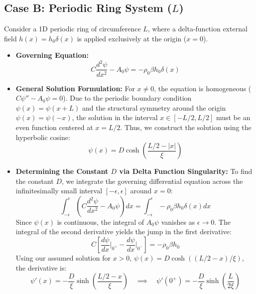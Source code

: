 \documentclass[12pt,a4paper]{article}
\begin{document}
\subsection{Case B: Periodic Ring System ($L$)}
Consider a 1D periodic ring of circumference $L$, where a delta-function external field $h(x) = h_0 \delta(x)$ is applied exclusively at the origin ($x=0$).
\begin{itemize}
    \item \textbf{Governing Equation:}
    \begin{equation}
        C \frac{d^2\psi}{dx^2} - A_0 \psi = -\rho_0 \beta h_0 \delta(x)
    \end{equation}
    \item \textbf{General Solution Formulation:} 
    For $x \neq 0$, the equation is homogeneous ($C\psi'' - A_0\psi = 0$). Due to the periodic boundary condition $\psi(x) = \psi(x+L)$ and the structural symmetry around the origin $\psi(x) = \psi(-x)$, the solution in the interval $x \in [-L/2, L/2]$ must be an even function centered at $x=L/2$. Thus, we construct the solution using the hyperbolic cosine:
    \begin{equation}
        \psi(x) = D \cosh\left( \frac{L/2 - |x|}{\xi} \right)
    \end{equation}
    \item \textbf{Determining the Constant $D$ via Delta Function Singularity:}
    To find the constant $D$, we integrate the governing differential equation across the infinitesimally small interval $[-\epsilon, \epsilon]$ around $x=0$:
    \begin{equation}
        \int_{-\epsilon}^{\epsilon} \left( C \frac{d^2\psi}{dx^2} - A_0 \psi \right) dx = \int_{-\epsilon}^{\epsilon} -\rho_0 \beta h_0 \delta(x) dx
    \end{equation}
    Since $\psi(x)$ is continuous, the integral of $A_0\psi$ vanishes as $\epsilon \to 0$. The integral of the second derivative yields the jump in the first derivative:
    \begin{equation}
        C \left[ \frac{d\psi}{dx}\bigg|_{0^+} - \frac{d\psi}{dx}\bigg|_{0^-} \right] = -\rho_0 \beta h_0
    \end{equation}
    Using our assumed solution for $x > 0$, $\psi(x) = D \cosh((L/2 - x)/\xi)$, the derivative is:
    \begin{equation}
        \psi'(x) = -\frac{D}{\xi} \sinh\left( \frac{L/2 - x}{\xi} \right) \quad \implies \quad \psi'(0^+) = -\frac{D}{\xi} \sinh\left( \frac{L}{2\xi} \right)
    \end{equation}

\end{itemize}
\end{document}
